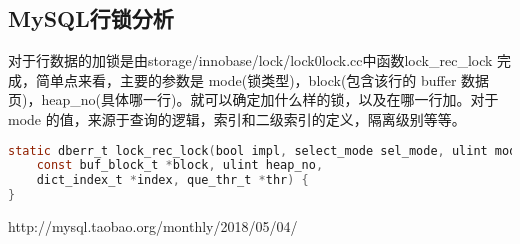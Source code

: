 \documentclass[../../../interview-questions.tex]{subfiles}
\begin{document}
\subsection{MySQL行锁分析}

对于行数据的加锁是由storage/innobase/lock/lock0lock.cc中函数lock\_rec\_lock 完成，简单点来看，主要的参数是 mode(锁类型)，block(包含该行的 buffer 数据页)，heap\_no(具体哪一行)。就可以确定加什么样的锁，以及在哪一行加。对于 mode 的值，来源于查询的逻辑，索引和二级索引的定义，隔离级别等等。

\begin{lstlisting}[language=C]
static dberr_t lock_rec_lock(bool impl, select_mode sel_mode, ulint mode,
    const buf_block_t *block, ulint heap_no,
    dict_index_t *index, que_thr_t *thr) {
}
\end{lstlisting}

http://mysql.taobao.org/monthly/2018/05/04/
\end{document}
